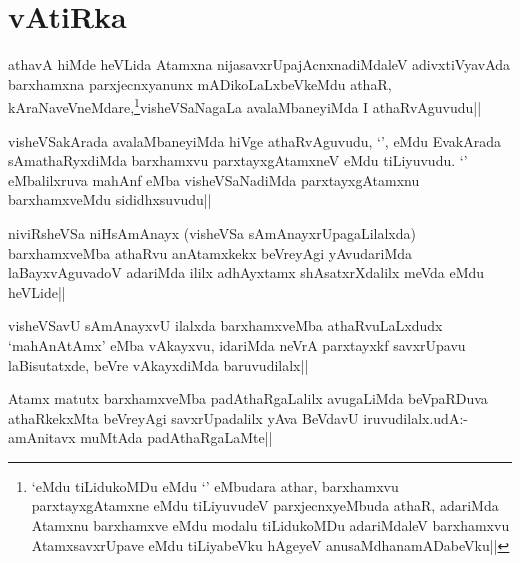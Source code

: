 \section*{vAtiRka}


\begin{artha}
athavA hiMde heVLida Atamxna nijasavxrUpajAcnxnadiMdaleV adivxtiVyavAda barxhamxna parxjecnxyanunx mADikoLaLxbeVkeMdu athaR, kAraNaveVneMdare,\footnote{`\stext eMdu tiLidukoMDu eMdu `\stext' eMbudara athar, barxhamxvu parxtayxgAtamxne eMdu tiLiyuvudeV parxjecnxyeMbuda athaR, adariMda Atamxnu barxhamxve eMdu modalu tiLidukoMDu adariMdaleV barxhamxvu AtamxsavxrUpave eMdu tiLiyabeVku hAgeyeV anusaMdhanamADabeVku||}visheVSaNagaLa avalaMbaneyiMda I athaRvAguvudu||
\end{artha}

\begin{artha}
visheVSakArada avalaMbaneyiMda hiVge athaRvAguvudu, `\stext', eMdu EvakArada sAmathaRyxdiMda barxhamxvu parxtayxgAtamxneV eMdu tiLiyuvudu. `\stext' eMbalilxruva mahAnf eMba visheVSaNadiMda parxtayxgAtamxnu barxhamxveMdu sididhxsuvudu||
\end{artha}


\begin{artha}
niviRsheVSa niHsAmAnayx (visheVSa sAmAnayxrUpagaLilalxda) barxhamxveMba athaRvu anAtamxkekx beVreyAgi yAvudariMda laBayxvAguvadoV adariMda ililx adhAyxtamx shAsatxrXdalilx meVda eMdu heVLide||
\end{artha}


\begin{artha}
visheVSavU sAmAnayxvU ilalxda barxhamxveMba athaRvuLaLxdudx `mahAnAtAmx' eMba vAkayxvu, idariMda neVrA parxtayxkf savxrUpavu laBisutatxde, beVre vAkayxdiMda baruvudilalx||
\end{artha}


\begin{artha}
Atamx matutx barxhamxveMba padAthaRgaLalilx avugaLiMda beVpaRDuva athaRkekxMta beVreyAgi savxrUpadalilx yAva BeVdavU iruvudilalx.udA:-amAnitavx muMtAda padAthaRgaLaMte||
\end{artha}

